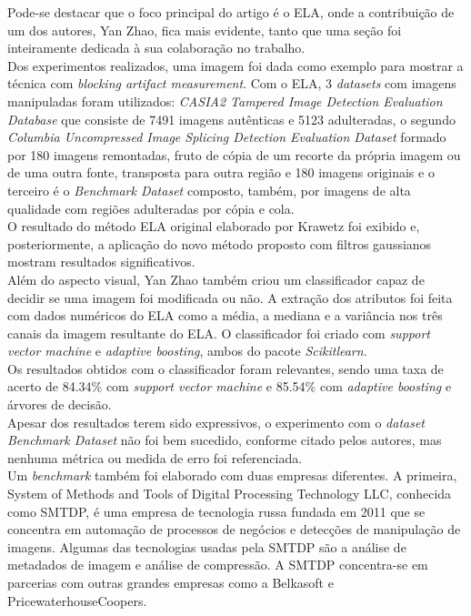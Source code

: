 \begin{enumerate}
\begin{enumerate}[label*=\arabic*.]
Pode-se destacar que o foco principal do artigo é o ELA, onde a contribuição de um dos autores, Yan Zhao, fica mais evidente, tanto que uma seção foi inteiramente dedicada à sua colaboração no trabalho.
\\[6pt]
Dos experimentos realizados, uma imagem foi dada como exemplo para mostrar a técnica com \textit{blocking artifact measurement}. Com o ELA, 3 \textit{datasets} com imagens manipuladas foram utilizados: \textit{CASIA2 Tampered Image Detection Evaluation Database} que consiste de 7491 imagens autênticas e 5123 adulteradas, o segundo \textit{Columbia Uncompressed Image Splicing Detection Evaluation Dataset} formado por 180 imagens remontadas, fruto de cópia de um recorte da própria imagem ou de uma outra fonte, transposta para outra região e 180 imagens originais e o terceiro é o \textit{Benchmark Dataset} composto, também, por imagens de alta qualidade com regiões adulteradas por cópia e cola.
\\[6pt]
O resultado do método ELA original elaborado por Krawetz \cite{krawetz} foi exibido e, posteriormente, a aplicação do novo método proposto com filtros gaussianos mostram resultados significativos.
\\[6pt]
Além do aspecto visual, Yan Zhao também criou um classificador capaz de decidir se uma imagem foi modificada ou não. A extração dos atributos foi feita com dados numéricos do ELA como a média, a mediana e a variância nos três canais da imagem resultante do ELA. O classificador foi criado com \textit{support vector machine} e \textit{adaptive boosting}, ambos do pacote \textit{Scikitlearn}.
\\[6pt]
Os resultados obtidos com o classificador foram relevantes, sendo uma taxa de acerto de 84.34\% com \textit{support vector machine} e 85.54\% com \textit{adaptive boosting} e árvores de decisão.
\\[6pt]
Apesar dos resultados terem sido expressivos, o experimento com o \textit{dataset} \textit{Benchmark Dataset} não foi bem sucedido, conforme citado pelos autores, mas nenhuma métrica ou medida de erro foi referenciada.
\\[6pt]
Um \textit{benchmark} também foi elaborado com duas empresas diferentes. A primeira, System of Methods and Tools of Digital Processing Technology LLC, conhecida como SMTDP, é uma empresa de tecnologia russa fundada em 2011 que se concentra em automação de processos de negócios e detecções de manipulação de imagens. Algumas das tecnologias usadas pela SMTDP são a análise de metadados de imagem e análise de compressão. A SMTDP concentra-se em parcerias com outras grandes empresas como a Belkasoft e PricewaterhouseCoopers.

\end{enumerate}
\end{enumerate}
